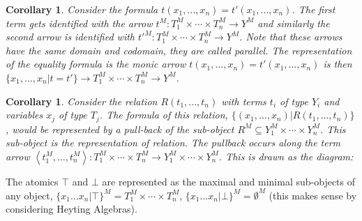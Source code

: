 \documentclass[12pt,a4paper]{article}
\newtheorem{corollary}[theorem]{Corollary}
\begin{document}
\begin{corollary}
    Consider the formula $t(x_1,\ldots,x_n)=t'(x_1,\ldots,x_n)$. The first term gets identified with the arrow $t^M:T_1^M\times\cdots\times T_n^M\to Y^M$ and similarly the second arrow is identified with $t'^M:T_1^M\times\cdots\times T_n^M\to Y^M$.
    Note that these arrows have the same domain and codomain, they are called \textit{parallel}.
    The representation of the equality formula is the monic arrow $t(x_1,\ldots,x_n)=t'(x_1,\ldots,x_n)$ is then $\{x_1,\ldots,x_n|t=t'\}\to T_1^M\times\cdots\times T_n^M\to Y^M$.
\end{corollary}

\begin{corollary}
    Consider the relation $R(t_1,\ldots,t_n)$ with terms $t_i$ of type $Y_i$ and variables $x_j$ of type $T_j$.
    The formula of this relation, $\{(x_1,\ldots,x_n)|R(t_1,\ldots,t_n)\}$, would be represented by a pull-back of the sub-object $R^M\subseteq Y_1^M\times\cdots\times Y_n^M$.
    This sub-object is the representation of relation.
    The pullback occurs along the term arrow $\left<t_1^M,\ldots,t_n^M\right>:T_1^M\times\cdots\times T_n^M\to Y_1^M\times\cdots\times Y_n^M$.
    This is drawn as the diagram:
    \begin{center}
    \end{center}
\end{corollary}

The atomics $\top$ and $\bot$ are represented as the maximal and minimal sub-objects of any object,
$\{x_1\ldots x_n|\top\}^M=T_1^M\times\cdots\times T_n^M$, $\{x_1\ldots x_n|\bot\}^M=\emptyset^M$ (this makes sense by considering Heyting Algebras).\\
\end{document}
